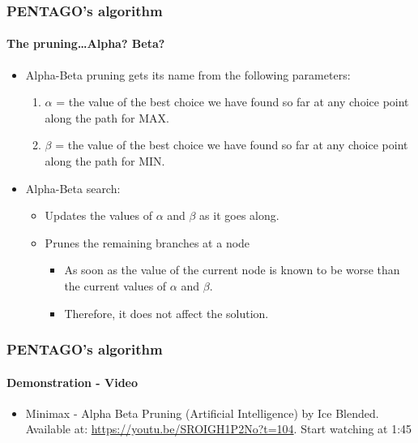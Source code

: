 \documentclass[10pt]{beamer}
\begin{document}
\begin{frame}
\frametitle{PENTAGO's algorithm}
\framesubtitle{The pruning\ldots Alpha? Beta?}

	\begin{itemize}
	  
		\item  Alpha-Beta pruning gets its name from the following parameters:
		
			\begin{enumerate}
			  \item \(\alpha\) = the value of the best choice we have found so far at any
			  choice point along the path for MAX.
			  \item \(\beta\) = the value of the best choice we have found so far at any
			  choice point along the path for MIN.
			\end{enumerate}
			
		\item Alpha-Beta search:
		
			\begin{itemize}
			  
			  \item Updates the values of \(\alpha\) and \(\beta\) as it goes along.
			  \item Prunes the remaining branches at a node
			  \begin{itemize} 
				  \item As soon as the value of the current node is known to be worse than
				  the current values of \(\alpha\) and \(\beta\).
				  \item Therefore, it does not affect the solution.
			  \end{itemize}
			\end{itemize}
				
	\end{itemize}
\end{frame}

\begin{frame}
\frametitle{PENTAGO's algorithm}
\framesubtitle{Demonstration - Video}

	\begin{itemize}
	  
		\item  Minimax - Alpha Beta Pruning (Artificial Intelligence) by Ice
		Blended. \\
		Available at: \url{https://youtu.be/SROIGH1P2No?t=104}. Start watching at
		1:45\\
				
	\end{itemize}
\end{frame}
\end{document}
